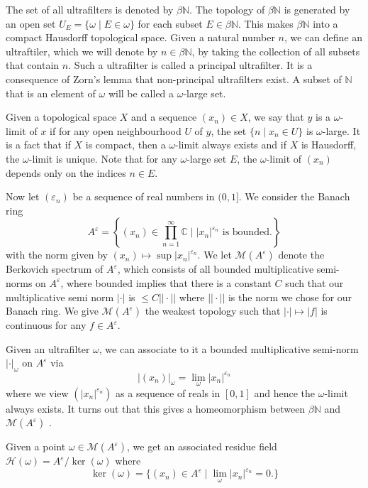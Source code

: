 \documentclass[10pt]{amsart}
\newcommand{\bb}{\mathbb}
\newcommand{\cal}{\mathcal}
\newcommand{\eps}{\varepsilon}
\numberwithin{theorem}{section}
\numberwithin{example}{section}
\numberwithin{definition}{section}
\begin{document}
The set of all ultrafilters is denoted by $\beta \bb{N}$. The topology of $\beta \bb{N}$ is generated by an open set $U_E = \{ \omega \mid E \in \omega\}$ for each subset $E \in \beta \bb{N}$. This makes $\beta \bb{N}$ into a compact Hausdorff topological space. Given a natural number $n$, we can define an ultraftiler, which we will denote by $n \in \beta \bb{N}$, by taking the collection of all subsets that contain $n$. Such a ultrafilter is called a principal ultrafilter. It is a consequence of Zorn's lemma that non-principal ultrafilters exist. A subset of $\bb{N}$ that is an element of $\omega$ will be called a $\omega$-large set.  
\par 
Given a topological space $X$ and a sequence $(x_n) \in X$, we say that $y$ is a $\omega$-limit of $x$ if for any open neighbourhood $U$ of $y$, the set $\{n \mid x_n \in U \}$ is $\omega$-large. It is a fact that if $X$ is compact, then a $\omega$-limit always exists and if $X$ is Hausdorff, the $\omega$-limit is unique. Note that for any $\omega$-large set $E$, the $\omega$-limit of $(x_n)$ depends only on the indices $n \in E$. 
\par 
Now let $(\eps_n)$ be a sequence of real numbers in $(0,1]$. We consider the Banach ring 
$$A^{\eps} = \left\{ (x_n) \in \prod_{n=1}^{\infty} \bb{C} \mid |x_n|^{\eps_n} \text{ is bounded}.\right\}$$
with the norm given by $(x_n) \mapsto \sup |x_n|^{\eps_n}$. We let $\cal{M}(A^{\eps})$ denote the Berkovich spectrum of $A^{\eps}$, which consists of all bounded multiplicative semi-norms on $A^{\eps}$, where bounded implies that there is a constant $C$ such that our multiplicative semi norm $| \cdot |$ is $\leq C || \cdot ||$ where $|| \cdot ||$ is the norm we chose for our Banach ring. We give $\cal{M}(A^{\eps})$ the weakest topology such that $| \cdot | \mapsto |f|$ is continuous for any $f \in A^{\eps}$.  
\par 
Given an ultrafilter $\omega$, we can associate to it a bounded multiplicative semi-norm $| \cdot |_{\omega}$ on $A^{\eps}$ via 
$$|(x_n)|_{\omega} = \lim_{\omega} |x_n|^{\eps_n}$$
where we view $(|x_n|^{\eps_n})$ as a sequence of reals in $[0,1]$ and hence the $\omega$-limit always exists. It turns out that this gives a homeomorphism between $\beta \bb{N}$ and $\cal{M}(A^{\eps})$ \cite[Theorem 3.8]{FG24}. 
\par 
Given a point $\omega \in \cal{M}(A^{\eps})$, we get an associated residue field $\cal{H}(\omega) = A^{\eps}/\ker(\omega)$ where 
$$\ker(\omega) = \{ (x_n) \in A^{\eps} \mid \lim_{\omega} |x_n|^{\eps_n} = 0.\}$$
\end{document}
